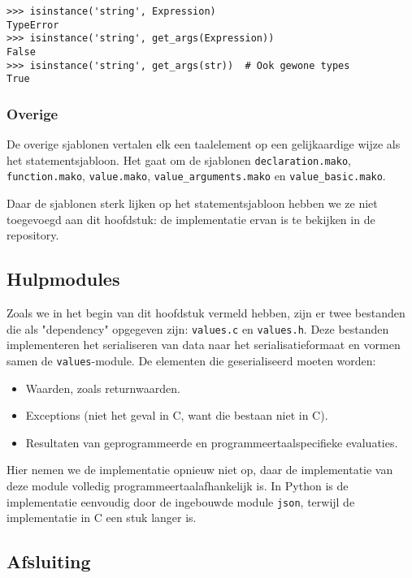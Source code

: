 \begin{verbatim}
>>> isinstance('string', Expression)
TypeError
>>> isinstance('string', get_args(Expression))
False
>>> isinstance('string', get_args(str))  # Ook gewone types
True
\end{verbatim}

\subsubsection{Overige}

De overige sjablonen vertalen elk een taalelement op een gelijkaardige wijze als het statementsjabloon.
Het gaat om de sjablonen \texttt{declaration.mako}, \texttt{function.mako}, \texttt{value.mako}, \texttt{value\_arguments.mako} en \texttt{value\_basic.mako}.

Daar de sjablonen sterk lijken op het statementsjabloon hebben we ze niet toegevoegd aan dit hoofdstuk: de implementatie ervan is te bekijken in de repository.

\subsection{Hulpmodules}\label{subsec:hulpmodules}

Zoals we in het begin van dit hoofdstuk vermeld hebben, zijn er twee bestanden die als "dependency" opgegeven zijn: \texttt{values.c} en \texttt{values.h}.
Deze bestanden implementeren het serialiseren van data naar het serialisatieformaat en vormen samen de \texttt{values}-module.
De elementen die geserialiseerd moeten worden:

\begin{itemize}
    \item Waarden, zoals returnwaarden.
    \item Exceptions (niet het geval in C, want die bestaan niet in C).
    \item Resultaten van geprogrammeerde en programmeertaalspecifieke evaluaties.
\end{itemize}

Hier nemen we de implementatie opnieuw niet op, daar de implementatie van deze module volledig programmeertaalafhankelijk is.
In Python is de implementatie eenvoudig door de ingebouwde module \texttt{json}, terwijl de implementatie in C een stuk langer is.

\subsection{Afsluiting}\label{subsec:afsluiting}

